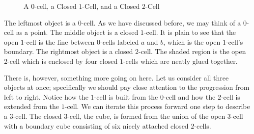 \begin{figure}[h]
\label{fig:nwacells}
\centering
\caption{A $0$-cell, a Closed $1$-Cell, and a Closed $2$-Cell}
\hspace{.5in}
\hspace{.5in}
\end{figure}

The leftmost object is a $0$-cell. As we have discussed before, we may think of a $0$-cell as a point. The middle object is a closed $1$-cell. It is plain to see that the open $1$-cell is the line between $0$-cells labeled $a$ and $b$, which is the open $1$-cell's boundary. The rightmost object is a closed $2$-cell. The shaded region is the open $2$-cell which is enclosed by four closed $1$-cells which are neatly glued together.

There is, however, something more going on here. Let us consider all three objects at once; specifically we should pay close attention to the progression from left to right. Notice how the $1$-cell is built from the $0$-cell and how the $2$-cell is extended from the $1$-cell. We can iterate this process forward one step to describe a $3$-cell. The closed $3$-cell, the cube, is formed from the union of the open $3$-cell with a boundary cube consisting of six nicely attached closed $2$-cells. 

